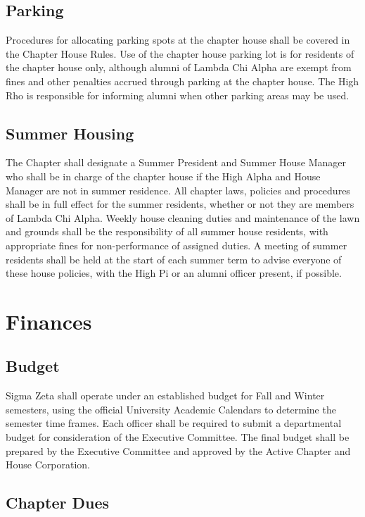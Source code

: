 \documentclass{article}
\begin{document}
\subsection{Parking}

Procedures for allocating parking spots at the chapter house shall be covered in
the Chapter House Rules. Use of the chapter house parking lot is for residents
of the chapter house only, although alumni of Lambda Chi Alpha are exempt from
fines and other penalties accrued through parking at the chapter house. The High
Rho is responsible for informing alumni when other parking areas may be used.

\subsection{Summer Housing}

The Chapter shall designate a Summer President and Summer House Manager who
shall be in charge of the chapter house if the High Alpha and House Manager are
not in summer residence. All chapter laws, policies and procedures shall be in
full effect for the summer residents, whether or not they are members of Lambda
Chi Alpha. Weekly house cleaning duties and maintenance of the lawn and grounds
shall be the responsibility of all summer house residents, with appropriate
fines for non-performance of assigned duties. A meeting of summer residents
shall be held at the start of each summer term to advise everyone of these house
policies, with the High Pi or an alumni officer present, if possible.

\section{Finances}

\subsection{Budget}

Sigma Zeta shall operate under an established budget for Fall and Winter
semesters, using the official University Academic Calendars to determine the
semester time frames. Each officer shall be required to submit a departmental
budget for consideration of the Executive Committee. The final budget shall be
prepared by the Executive Committee and approved by the Active Chapter and House
Corporation.

\subsection{Chapter Dues}
\end{document}
